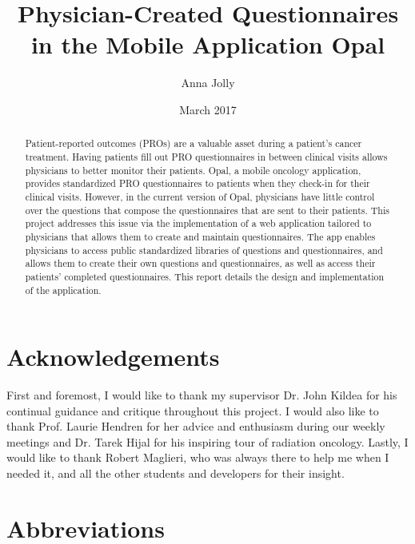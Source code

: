 \documentclass{higrep}
\title{Physician-Created Questionnaires in the Mobile Application Opal}
\date{March 2017}
\author{Anna Jolly}
\affiliation{School of Computer Science\\
  McGill University, Montreal\\
  \texttt{anna.jolly@mail.mcgill.ca}}
\begin{document}
\begin{abstract}
Patient-reported outcomes (PROs) are a valuable asset during a patient's cancer treatment. Having patients fill out PRO questionnaires in between clinical visits allows physicians to better monitor their patients. Opal, a mobile oncology application, provides standardized PRO questionnaires to patients when they check-in for their clinical visits. However, in the current version of Opal, physicians have little control over the questions that compose the questionnaires that are sent to their patients. This project addresses this issue via the implementation of a web application tailored to physicians that allows them to create and maintain questionnaires. The app enables physicians to access public standardized libraries of questions and questionnaires, and allows them to create their own questions and questionnaires, as well as access their patients' completed questionnaires. This report details the design and implementation of the application.
\end{abstract}

\disclaimer{}

\maketitle

\tableofcontents

\listoffiguresandtables


\chapter{Acknowledgements}

First and foremost, I would like to thank my supervisor Dr. John Kildea for his continual guidance and critique throughout this project. I would also like to thank Prof. Laurie Hendren for her advice and enthusiasm during our weekly meetings and Dr. Tarek Hijal for his inspiring tour of radiation oncology. Lastly, I would like to thank Robert Maglieri, who was always there to help me when I needed it, and all the other students and developers for their insight.

\chapter{Abbreviations}
\end{document}
